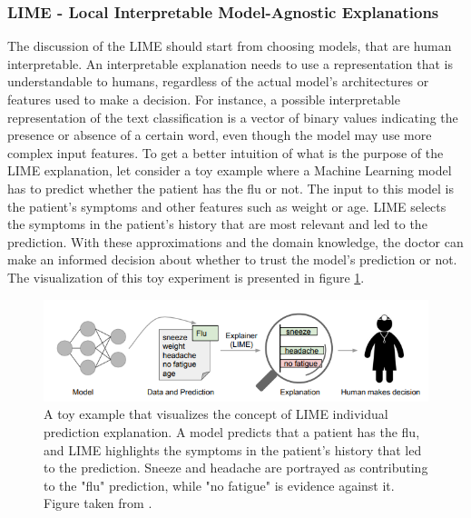 \subsubsection{LIME - Local Interpretable Model-Agnostic Explanations }
\label{sec:lime}
The discussion of the LIME should start from choosing models, that are human interpretable. An interpretable explanation needs to use a representation that is understandable to humans, regardless of the actual model's architectures or features used to make a decision. For instance, a possible interpretable representation of the text classification is a vector of binary values indicating the presence or absence of a certain word, even though the model may use more complex input features.
To get a better intuition of what is the purpose of the LIME explanation, let consider a toy example where a Machine Learning model has to predict whether the patient has the flu or not. The input to this model is the patient's symptoms and other features such as weight or age. LIME selects the symptoms in the patient's history that are most relevant and led to the prediction. With these approximations and the domain knowledge, the doctor can make an informed decision about whether to trust the model's prediction or not. The visualization of this toy experiment is presented in figure \ref{fig:LIME_doctor}.

\begin{figure}[!htb]
\centering
\includegraphics{figures/lime_doctor.PNG}
\caption{A toy example that visualizes the concept of LIME individual prediction explanation. A model predicts that a patient has the flu, and LIME highlights the symptoms in the patient's history that led to the prediction. Sneeze and headache are portrayed as contributing to the "flu" prediction, while "no fatigue" is evidence against it. Figure taken from \cite{lime}.
\label{fig:LIME_doctor}}
\end{figure} 

